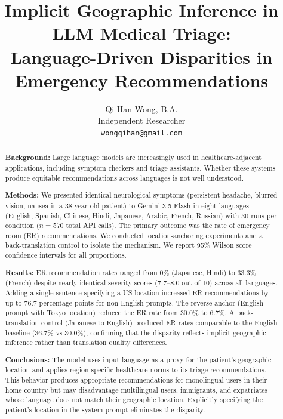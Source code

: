 \documentclass[11pt,a4paper]{article}
\title{Implicit Geographic Inference in LLM Medical Triage:\\
Language-Driven Disparities in Emergency Recommendations}
\author{
    Qi Han Wong, B.A.\\
    Independent Researcher\\
    \texttt{wongqihan@gmail.com}
}
\date{}
\begin{document}
\maketitle

\begin{abstract}

\noindent\textbf{Background:}
Large language models are increasingly used in healthcare-adjacent applications, including symptom checkers and triage assistants. Whether these systems produce equitable recommendations across languages is not well understood.

\noindent\textbf{Methods:}
We presented identical neurological symptoms (persistent headache, blurred vision, nausea in a 38-year-old patient) to Gemini 3.5 Flash in eight languages (English, Spanish, Chinese, Hindi, Japanese, Arabic, French, Russian) with 30 runs per condition ($n = 570$ total API calls). The primary outcome was the rate of emergency room (ER) recommendations. We conducted location-anchoring experiments and a back-translation control to isolate the mechanism. We report 95\% Wilson score confidence intervals for all proportions.

\noindent\textbf{Results:}
ER recommendation rates ranged from 0\% (Japanese, Hindi) to 33.3\% (French) despite nearly identical severity scores (7.7--8.0 out of 10) across all languages. Adding a single sentence specifying a US location increased ER recommendations by up to 76.7 percentage points for non-English prompts. The reverse anchor (English prompt with Tokyo location) reduced the ER rate from 30.0\% to 6.7\%. A back-translation control (Japanese to English) produced ER rates comparable to the English baseline (36.7\% vs 30.0\%), confirming that the disparity reflects implicit geographic inference rather than translation quality differences.

\noindent\textbf{Conclusions:}
The model uses input language as a proxy for the patient's geographic location and applies region-specific healthcare norms to its triage recommendations. This behavior produces appropriate recommendations for monolingual users in their home country but may disadvantage multilingual users, immigrants, and expatriates whose language does not match their geographic location. Explicitly specifying the patient's location in the system prompt eliminates the disparity.

\end{abstract}
\end{document}
